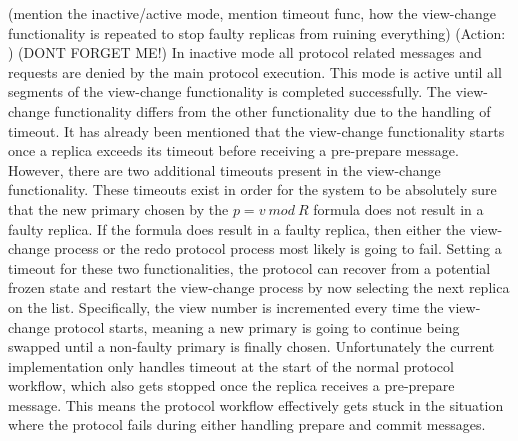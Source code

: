 \iffalse
(mention the inactive/active mode, mention timeout func, how the view-change functionality is repeated to stop faulty replicas from ruining everything)
(Action: )
(DONT FORGET ME!)
In inactive mode all protocol related messages and requests are denied by the main protocol execution. This mode is active until all segments of the view-change functionality is completed successfully. The view-change functionality differs from the other functionality due to the handling of timeout. It has already been mentioned that the view-change functionality starts once a replica exceeds its timeout before receiving a pre-prepare message. However, there are two additional timeouts present in the view-change functionality. These timeouts exist in order for the system to be absolutely sure that the new primary chosen by the $p = v ~mod~ R$ formula does not result in a faulty replica. If the formula does result in a faulty replica, then either the view-change process or the redo protocol process most likely is going to fail. Setting a timeout for these two functionalities, the protocol can recover from a potential frozen state and restart the view-change process by now selecting the next replica on the list. Specifically, the view number is incremented every time the view-change protocol starts, meaning a new primary is going to continue being swapped until a non-faulty primary is finally chosen. Unfortunately the current implementation only handles timeout at the start of the normal protocol workflow, which also gets stopped once the replica receives a pre-prepare message. This means the protocol workflow effectively gets stuck in the situation where the protocol fails during either handling prepare and commit messages. 

